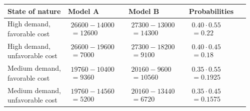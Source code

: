 \begin{ExamProblems}
\begin{center}
		\begin{tabular}{p{0.24\linewidth} p{0.24\linewidth} p{0.24\linewidth} p{0.24\linewidth}}
			\toprule
			State of nature & Model A & Model B & Probabilities \\
			\midrule
			\parbox[t]{\linewidth}{High demand,\\ favorable cost} &
			$\begin{array}{l}
				26600 - 14000\\
				= 12600
			\end{array}$ &
			$\begin{array}{l}
				27300 - 13000\\
				= 14300
			\end{array}$ &
			$\begin{array}{l}
				0.40\cdot 0.55\\
				= 0.22
			\end{array}$ \\
			
			\parbox[t]{\linewidth}{High demand,\\ unfavorable cost} &
			$\begin{array}{l}
				26600 - 19600\\
				= 7000
			\end{array}$ &
			$\begin{array}{l}
				27300 - 18200\\
				= 9100
			\end{array}$ &
			$\begin{array}{l}
				0.40\cdot 0.45\\
				= 0.18
			\end{array}$ \\
			
			\parbox[t]{\linewidth}{Medium demand,\\ favorable cost} &
			$\begin{array}{l}
				19760 - 10400\\
				= 9360
			\end{array}$ &
			$\begin{array}{l}
				20160 - 9600\\
				= 10560
			\end{array}$ &
			$\begin{array}{l}
				0.35\cdot 0.55\\
				= 0.1925
			\end{array}$ \\
			
			\parbox[t]{\linewidth}{Medium demand,\\ unfavorable cost} &
			$\begin{array}{l}
				19760 - 14560\\
				= 5200
			\end{array}$ &
			$\begin{array}{l}
				20160 - 13440\\
				= 6720
			\end{array}$ &
			$\begin{array}{l}
				0.35\cdot 0.45\\
				= 0.1575
			\end{array}$ \\
			

\end{tabular}
\end{center}
\end{ExamProblems}
